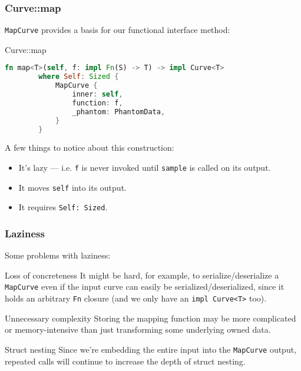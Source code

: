 \documentclass[10pt]{beamer}
\begin{document}
\begin{frame}[fragile]
    \frametitle{Curve::map}
    \verb|MapCurve| provides a basis for our functional interface method:
    \begin{block}{Curve::map}
    \begin{lstlisting}[language=Rust, gobble=8]
        fn map<T>(self, f: impl Fn(S) -> T) -> impl Curve<T> 
        where Self: Sized {
            MapCurve {
                inner: self,
                function: f,
                _phantom: PhantomData,
            }
        }
	\end{lstlisting}\pause
    \end{block}
    A few things to notice about this construction:
    \begin{itemize}
        \item It's lazy --- i.e. \texttt{f} is never invoked until \texttt{sample} is called on its output.\pause
        \item It moves \texttt{self} into its output.\pause
        \item It requires \verb|Self: Sized|.
    \end{itemize}
\end{frame}

\begin{frame}
    \frametitle{Laziness}
    Some problems with laziness:
    \begin{alertblock}{Loss of concreteness}
        It might be hard, for example, to serialize/deserialize a \texttt{MapCurve} even if the input curve can easily be serialized/deserialized, since it holds an arbitrary \texttt{Fn} closure (and we only have an \texttt{impl Curve<T>} too).
    \end{alertblock}\pause
    
    \begin{alertblock}{Unnecessary complexity}
        Storing the mapping function may be more complicated or memory-intensive than just transforming some underlying owned data.
    \end{alertblock}\pause

    \begin{alertblock}{Struct nesting}
        Since we're embedding the entire input into the \texttt{MapCurve} output, repeated calls will continue to increase the depth of struct nesting. 
    \end{alertblock}
\end{frame}
\end{document}
